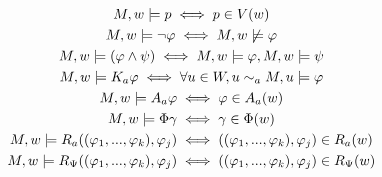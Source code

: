 \begin{gather*}
	M, w |= p \iff p \in V(w) \\
	M, w |= \neg\varphi \iff M, w \not\models \varphi\\
	M, w |= (\varphi \land \psi) \iff M, w |= \varphi, M, w |= \psi \\
	M, w |= K_a\varphi \iff \forall u\in W, u \sim_{a} M, u |= \varphi \\
	M, w |= A_a\varphi \iff \varphi \in A_a(w) \\
	M, w |= \Phi\gamma \iff \gamma \in \Phi(w) \\
	M, w |= R_a((\varphi_1,...,\varphi_k), \varphi_j) \iff ((\varphi_1,...,\varphi_k), \varphi_j) \in R_a(w) \\
	M, w |= R_\Psi((\varphi_1,...,\varphi_k), \varphi_j) \iff ((\varphi_1,...,\varphi_k), \varphi_j) \in R_\Psi(w)
\end{gather*}

